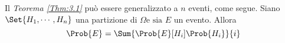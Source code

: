 \documentclass{subfiles}
\begin{document}
Il \emph{Teorema \ref{Thm:3.1}} può essere generalizzato a $n$ eventi, come segue.
Siano $\Set{H_{1}, \cdots, H_{n}}$ una partizione di $\Omega \text{e sia } E$ un evento.
Allora
$$
    \Prob{E} = \Sum{\Prob{E}[H_{i}] \Prob{H_{i}}}{i}
$$
\end{document}
